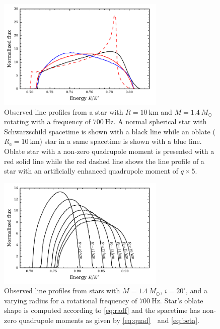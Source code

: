\documentclass[iop, usenatbib]{emulateapj}
\newcommand{\sch}{Schwarzschild }
\newcommand{\Msun}{\ensuremath{M_{\odot}}}
\begin{document}
\begin{figure}
\includegraphics[width=8cm]{figs/fig9a.pdf}
\caption{\label{fig:line_profiles}
  Observed line profiles from a star with $R=10~\mathrm{km}$ and $M=1.4~\Msun$ rotating with a frequency of $700~\mathrm{Hz}$.
  A normal spherical star with \sch spacetime is shown with a black line while an oblate ($R_{\mathrm{e}}=10~\mathrm{km}$) star in a same spacetime is shown with a blue line.
  Oblate star with a non-zero quadrupole moment is presented with a red solid line while the red dashed line shows the line profile of a star with an artificially enhanced quadrupole moment of $q \times 5$.
  }
\end{figure}


\begin{figure}
\includegraphics[width=8cm]{figs/fig9c.pdf}
\caption{\label{fig:line_profiles_sweep}
  Observed line profiles from stars with $M = 1.4~\Msun$, $i = 20^{\circ}$, and a varying radius for a rotational frequency of $700~\mathrm{Hz}$.
  Star's oblate shape is computed according to \eqref{eq:radf} and the spacetime has non-zero quadrupole moments as given by \eqref{eq:quad}~ and \eqref{eq:beta}.
  }
\end{figure}
\end{document}
